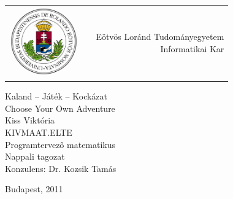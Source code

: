 \begin{titlepage}

\begin{tabular}{p{1in}p{0.8in}r}
\parbox{3cm}{\includegraphics[height=30mm]{eltecimer}} & & 
\parbox{7.0cm}{
  Eötvös Loránd Tudományegyetem \\
  Informatikai Kar}
\\[6.0cm]
\end{tabular}

\begin{center}
{\Huge Kaland -- Játék -- Kockázat }\\ [0.3cm]
{\Large Choose Your Own Adventure} \\ [1cm]
{\Large Kiss Viktória} \\ [0.3cm]
{\Large KIVMAAT.ELTE} \\ [0.3cm]
{\Large Programtervező matematikus} \\ [0.3cm]
{\Large Nappali tagozat} \\ [1cm]
{\Large Konzulens: Dr. Kozsik Tamás}
\end{center}
\vfill{\large Budapest, 2011}

\end{titlepage}
